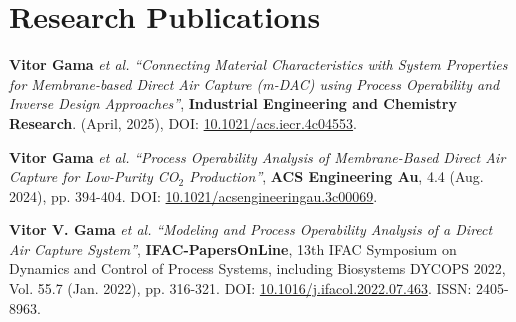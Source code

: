 \documentclass[letterpaper,11pt]{article}
\begin{document}

 \renewcommand*{\bibfont}{\small} %
 \setlength{\bibhang}{10pt} %
 \section*{Research Publications}
 
 
 \begin{enumerate}[leftmargin=*,label={[\arabic*]}]  %
     \item \textbf{Vitor Gama} \textit{et al.} 
     \textit{“Connecting Material Characteristics with System Properties for Membrane-based Direct Air Capture (m-DAC) using Process Operability and Inverse Design Approaches”}, 
     \textbf{Industrial Engineering and Chemistry Research}. (April, 2025), DOI: \href{https://doi.org/10.1021/acs.iecr.4c04553}{10.1021/acs.iecr.4c04553}.
 
     \item \textbf{Vitor Gama} \textit{et al.}  
     \textit{“Process Operability Analysis of Membrane-Based Direct Air Capture for Low-Purity CO$_2$ Production”}, 
     \textbf{ACS Engineering Au}, 4.4 (Aug. 2024), pp. 394-404. DOI: \href{https://doi.org/10.1021/acsengineeringau.3c00069}{10.1021/acsengineeringau.3c00069}.
     
     \item \textbf{Vitor V. Gama} \textit{et al.} 
     \textit{“Modeling and Process Operability Analysis of a Direct Air Capture System”}, 
     \textbf{IFAC-PapersOnLine}, 13th IFAC Symposium on Dynamics and Control of Process Systems, including Biosystems DYCOPS 2022, 
     Vol. 55.7 (Jan. 2022), pp. 316-321. DOI: \href{https://doi.org/10.1016/j.ifacol.2022.07.463}{10.1016/j.ifacol.2022.07.463}. 
     ISSN: 2405-8963.
 \end{enumerate}
 
 
\end{document}
